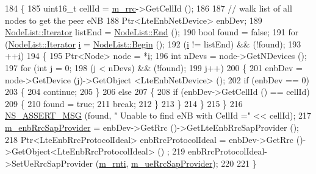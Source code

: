 \begin{DoxyCode}
184 \{
185 uint16\_t cellId = \hyperlink{classns3_1_1LteUeRrcProtocolIdeal_a09b70de3e8f4aeed8e0de75f3cf49116}{m\_rrc}->GetCellId ();  
186 
187   \textcolor{comment}{// walk list of all nodes to get the peer eNB}
188   Ptr<LteEnbNetDevice> enbDev;
189   \hyperlink{classns3_1_1NodeList_a9e2679a94efb4f0066cc21e65440364d}{NodeList::Iterator} listEnd = \hyperlink{classns3_1_1NodeList_a027a558c16e6078e25c7ffc67becb559}{NodeList::End} ();
190   \textcolor{keywordtype}{bool} found = \textcolor{keyword}{false};
191   \textcolor{keywordflow}{for} (\hyperlink{classns3_1_1NodeList_a9e2679a94efb4f0066cc21e65440364d}{NodeList::Iterator} \hyperlink{bernuolliDistribution_8m_a6f6ccfcf58b31cb6412107d9d5281426}{i} = \hyperlink{classns3_1_1NodeList_a93d2211831f5cb71d1dbb721e2721d7f}{NodeList::Begin} (); 
192        (\hyperlink{bernuolliDistribution_8m_a6f6ccfcf58b31cb6412107d9d5281426}{i} != listEnd) && (!found); 
193        ++\hyperlink{bernuolliDistribution_8m_a6f6ccfcf58b31cb6412107d9d5281426}{i})
194     \{
195       Ptr<Node> node = *\hyperlink{bernuolliDistribution_8m_a6f6ccfcf58b31cb6412107d9d5281426}{i};
196       \textcolor{keywordtype}{int} nDevs = node->GetNDevices ();
197       \textcolor{keywordflow}{for} (\textcolor{keywordtype}{int} j = 0; 
198            (j < nDevs) && (!found);
199            j++)
200         \{
201           enbDev = node->GetDevice (j)->GetObject <LteEnbNetDevice> ();
202           \textcolor{keywordflow}{if} (enbDev == 0)
203             \{
204               \textcolor{keywordflow}{continue};
205             \}
206           \textcolor{keywordflow}{else}
207             \{
208               \textcolor{keywordflow}{if} (enbDev->GetCellId () == cellId)
209                 \{
210                   found = \textcolor{keyword}{true};          
211                   \textcolor{keywordflow}{break};
212                 \}
213             \}
214         \}
215     \}
216   \hyperlink{assert_8h_aff5ece9066c74e681e74999856f08539}{NS\_ASSERT\_MSG} (found, \textcolor{stringliteral}{" Unable to find eNB with CellId ="} << cellId);
217   \hyperlink{classns3_1_1LteUeRrcProtocolIdeal_aace91c64d1b2fea461aabeb5dd3b0db6}{m\_enbRrcSapProvider} = enbDev->GetRrc ()->GetLteEnbRrcSapProvider ();  
218   Ptr<LteEnbRrcProtocolIdeal> enbRrcProtocolIdeal = enbDev->GetRrc ()->GetObject<LteEnbRrcProtocolIdeal> ()
      ;
219   enbRrcProtocolIdeal->SetUeRrcSapProvider (\hyperlink{classns3_1_1LteUeRrcProtocolIdeal_a89863bae51a39a5d6c88809513b1bb2e}{m\_rnti}, \hyperlink{classns3_1_1LteUeRrcProtocolIdeal_ae13167062799872f32a28dd0796b090f}{m\_ueRrcSapProvider});  
220   
221 \}
\end{DoxyCode}


